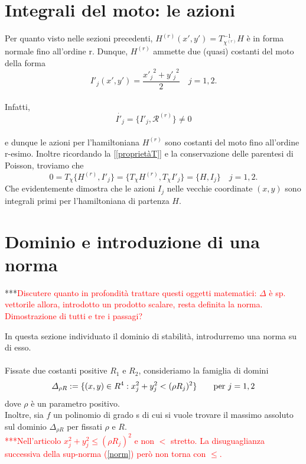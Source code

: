 \documentclass[a4paper,11pt,titlepage]{report}
\theoremstyle{definition}
\theoremstyle{plain}
\begin{document}
\section{Integrali del moto: le azioni}
Per quanto visto nelle sezioni precedenti, $H^{(r)}(x',y') = T_{\chi^{(r)}}^{-1}H$ è in forma normale fino all'ordine r.
Dunque, $H^{(r)}$ ammette due (quasi) costanti del moto della forma $$ I'_j (x', y') = \frac{{x'_j}^{2} + {y'_j}^{2}}{2} \quad j=1,2.$$
\\Infatti, 
\begin{equation}
	\label{eq:VelAzConResto}	\dot{I'_j} = \{I'_j,\mathcal{R}^{(r)}\} \neq 0
\end{equation}
\\e dunque le azioni per l'hamiltoniana $H^{(r)}$ sono costanti del moto fino all'ordine r-esimo.
Inoltre ricordando la \ref{[proprietàT]} e la conservazione delle parentesi di Poisson, troviamo che
$$ 0 = T_{\chi} \{H^{(r)}, I'_j\} = \{T_{\chi} H^{(r)},T_{\chi} I'_j\} = \{H,I_j\} \quad j=1,2.$$
Che evidentemente dimostra che le azioni $I_j$ nelle vecchie coordinate $(x,y)$ sono integrali primi per l'hamiltoniana di partenza $H$.

\section {Dominio e introduzione di una norma}

***\textcolor{red}{Discutere quanto in profondità trattare questi oggetti matematici:
	$\varDelta$ è sp. vettorile allora, introdotto un prodotto scalare, resta definita la norma. Dimostrazione di tutti e tre i passagi?}

In questa sezione individuato il dominio di stabilità, introdurremo una norma su di esso.\\
\\Fissate due costanti positive $R_1$ e $R_2$, consideriamo la famiglia di domini $$ \varDelta_{\rho R}:=\{(x,y)\in {R}^4 : x_j^2 + y_j^2 < (\rho R_j)^2 \} \qquad \hbox{per } j=1,2  $$ dove $\rho$ è un parametro positivo. \\Inoltre, sia $f$ un polinomio di grado s di cui si vuole trovare il massimo assoluto sul dominio $ \varDelta_{\rho R}$ per fissati $\rho$ e $R$. \\\textcolor{red}{***Nell'articolo \cite{OTSA} $x_j^2 + y_j^2 \leq (\rho R_j)^2$ e non $ < $ stretto. La disuguaglianza  successiva della sup-norma (\ref{norm}) però non torna con $\leq$. }
\end{document}
